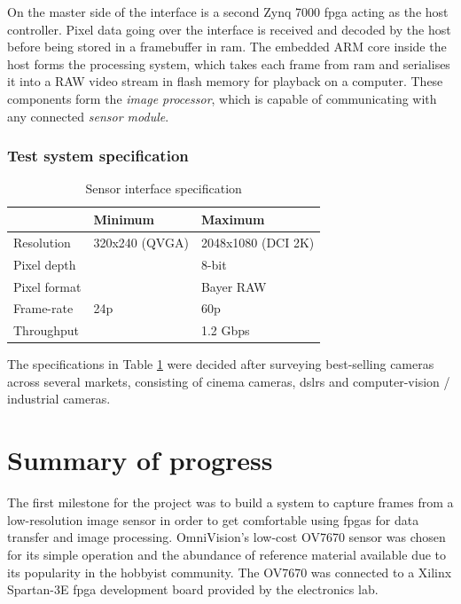 \documentclass[a4paper]{report}
\begin{document}
On the master side of the interface is a second Zynq 7000 \gls{fpga} acting as the host controller. Pixel data going over the interface is received and decoded by the host before being stored in a framebuffer in \gls{ram}. The embedded ARM core inside the host forms the processing system, which takes each frame from \gls{ram} and serialises it into a RAW video stream in flash memory for playback on a computer. These components form the \textit{image processor}, which is capable of communicating with any connected \textit{sensor module}.

\subsection{Test system specification}

\begin{table}
  \centering
  \begin{tabular}{l | ll}
               & Minimum        & Maximum            \\
  \hline
  Resolution   & 320x240 (QVGA) & 2048x1080 (DCI 2K) \\
  Pixel depth  &                & 8-bit              \\
  Pixel format &                & Bayer RAW          \\
  Frame-rate   & 24p            & 60p                \\
  Throughput   &                & 1.2 Gbps          
  \end{tabular}
  \caption{Sensor interface specification}
  \label{table:interface_specification}
\end{table}

The specifications in Table \ref{table:interface_specification} were decided after surveying best-selling cameras across several markets, consisting of cinema cameras, \glspl{dslr} and computer-vision / industrial cameras.




\printglossary[type=\acronymtype]

\chapter{Summary of progress}

The first milestone for the project was to build a system to capture frames from a low-resolution image sensor in order to get comfortable using \glspl{fpga} for data transfer and image processing. OmniVision's low-cost OV7670 sensor was chosen for its simple operation and the abundance of reference material available due to its popularity in the hobbyist community. The OV7670 was connected to a Xilinx Spartan-3E \gls{fpga} development board provided by the electronics lab.
\end{document}
